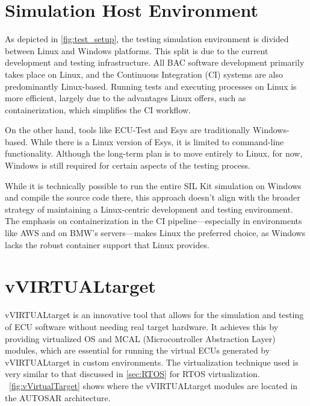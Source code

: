 \section{Simulation Host Environment}
As depicted in \autoref{fig:test_setup}, the testing simulation environment is divided between Linux and Windows platforms. This split is due to the current development and testing infrastructure. All BAC software development primarily takes place on Linux, and the Continuous Integration (CI) systems are also predominantly Linux-based. Running tests and executing processes on Linux is more efficient, largely due to the advantages Linux offers, such as containerization, which simplifies the CI workflow.





On the other hand, tools like ECU-Test and Esys are traditionally Windows-based. While there is a Linux version of Esys, it is limited to command-line functionality. Although the long-term plan is to move entirely to Linux, for now, Windows is still required for certain aspects of the testing process.

While it is technically possible to run the entire SIL Kit simulation on Windows and compile the source code there, this approach doesn't align with the broader strategy of maintaining a Linux-centric development and testing environment. The emphasis on containerization in the CI pipeline—especially in environments like AWS and on BMW’s servers—makes Linux the preferred choice, as Windows lacks the robust container support that Linux provides.

\section{vVIRTUALtarget}
vVIRTUALtarget is an innovative tool that allows for the simulation and testing of ECU software without needing real target hardware. It achieves this by providing virtualized OS and MCAL (Microcontroller Abstraction Layer) modules, which are essential for running the virtual ECUs generated by vVIRTUALtarget in custom environments. The virtualization technique used is very similar to that discussed in \autoref{sec:RTOS} for RTOS virtualization. ~\autoref{fig:vVirtualTarget} shows where the vVIRTUALtarget modules are located in the AUTOSAR architecture. \cite{vector_vvirtualtarget}

